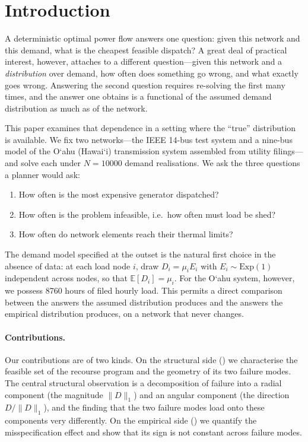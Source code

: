 \documentclass[11pt,a4paper]{article}
\theoremstyle{definition}
\theoremstyle{plain}
\theoremstyle{remark}
\newcommand{\E}{\mathbb{E}}
\newcommand{\okina}{\textquoteleft}
\begin{document}
\tableofcontents

\section{Introduction}

A deterministic optimal power flow answers one question: given this network and
this demand, what is the cheapest feasible dispatch? A great deal of practical
interest, however, attaches to a different question---given this network and a
\emph{distribution} over demand, how often does something go wrong, and what
exactly goes wrong. Answering the second question requires re-solving the first
many times, and the answer one obtains is a functional of the assumed demand
distribution as much as of the network.

This paper examines that dependence in a setting where the ``true'' distribution
is available. We fix two networks---the IEEE 14-bus test system and a nine-bus
model of the O\okina ahu (Hawai\okina i) transmission system assembled from
utility filings---and solve each under $N = \num{10000}$ demand realisations. We
ask the three questions a planner would ask:

\begin{enumerate}[label=(Q\arabic*),leftmargin=*]
\item How often is the most expensive generator dispatched?
\item How often is the problem infeasible, i.e.\ how often must load be shed?
\item How often do network elements reach their thermal limits?
\end{enumerate}

The demand model specified at the outset is the natural first choice in the
absence of data: at each load node $i$, draw $D_i = \mu_i E_i$ with
$E_i \sim \mathrm{Exp}(1)$ independent across nodes, so that $\E[D_i] = \mu_i$.
For the O\okina ahu system, however, we possess \num{8760} hours of filed hourly
load. This permits a direct comparison between the answers the assumed
distribution produces and the answers the empirical distribution produces, on a
network that never changes.

\paragraph{Contributions.}
Our contributions are of two kinds. On the structural side
() we characterise the feasible set of
the recourse program and the geometry of its two failure modes. The central
structural observation is a decomposition of failure into a radial component
(the magnitude $\lVert D\rVert_1$) and an angular component (the direction
$D/\lVert D\rVert_1$), and the finding that the two failure modes load onto these
components very differently. On the empirical side
() we quantify the misspecification
effect and show that its sign is not constant across failure modes.
\end{document}
